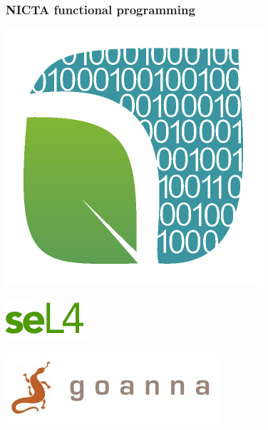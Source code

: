\begin{frame}
\frametitle{NICTA functional programming}
\begin{center}
\item \includegraphics[height=0.1\textheight,natwidth=360,natheight=360]{image/ambiata_avatar.png}
\vspace{2em}
\item \includegraphics[height=0.1\textheight,natwidth=114,natheight=57]{image/sel4.png}
\vspace{2em}
\item \includegraphics[height=0.1\textheight,natwidth=300,natheight=100]{image/goanna.jpg}
\end{center}
\end{frame}
